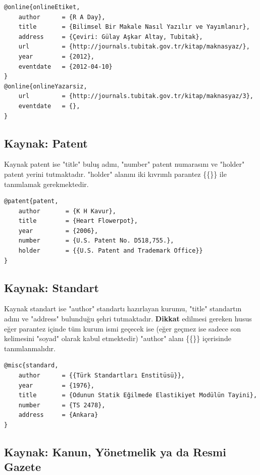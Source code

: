 \begin{lstlisting}[language={[LaTeX]{TeX}}, label=bib:web, caption=Kaynak web sayfası ise]
@online{onlineEtiket,
	author		= {R A Day},
	title		= {Bilimsel Bir Makale Nasıl Yazılır ve Yayımlanır},
	address 	= {Çeviri: Gülay Aşkar Altay, Tubitak},
	url			= {http://journals.tubitak.gov.tr/kitap/maknasyaz/},
	year		= {2012},
	eventdate	= {2012-04-10}
}
@online{onlineYazarsiz,
	url			= {http://journals.tubitak.gov.tr/kitap/maknasyaz/3},
	eventdate	= {},
}
\end{lstlisting}

\subsection{Kaynak: Patent}

Kaynak patent ise "title" buluş adını, "number" patent numarasını ve "holder" patent yerini tutmaktadır. "holder" alanını iki kıvrımlı parantez \{\{\}\} ile tanımlamak gerekmektedir. 

\begin{lstlisting}[language={[LaTeX]{TeX}}, label=bib:patent, caption=Kaynak patent ise]
@patent{patent,
	author       = {K H Kavur},
	title        = {Heart Flowerpot},
	year		 = {2006},
	number       = {U.S. Patent No. D518,755.},
	holder       = {{U.S. Patent and Trademark Office}}	
}
\end{lstlisting}

\subsection{Kaynak: Standart}

Kaynak standart ise "author" standartı hazırlayan kurumu, "title" standartın adını ve "address" bulunduğu şehri tutmaktadır. \textbf{Dikkat} edilmesi gereken husus eğer parantez içinde tüm kurum ismi geçecek ise (eğer geçmez ise sadece son kelimesini "soyad" olarak kabul etmektedir) "author" alanı \{\{\}\} içerisinde tanımlanmalıdır.

\begin{lstlisting}[language={[LaTeX]{TeX}}, label=bib:standart, caption=Kaynak standart ise]
@misc{standard,
	author		= {{Türk Standartları Enstitüsü}},
	year		= {1976},
	title		= {Odunun Statik Eğilmede Elastikiyet Modülün Tayini},
	number 		= {TS 2478},
	address     = {Ankara}
}
\end{lstlisting}

\subsection{Kaynak: Kanun, Yönetmelik ya da Resmi Gazete}

